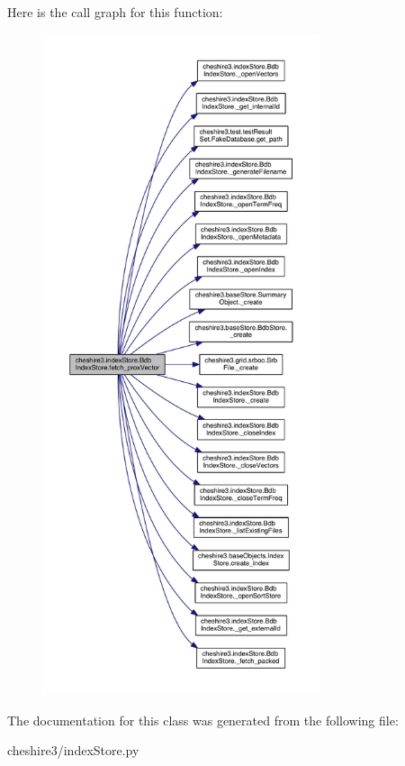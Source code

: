 Here is the call graph for this function\-:
\nopagebreak
\begin{figure}[H]
\begin{center}
\leavevmode
\includegraphics[height=550pt]{classcheshire3_1_1index_store_1_1_bdb_index_store_a4ca65462f1c80173e8d9a9127f4d2d1c_cgraph}
\end{center}
\end{figure}




The documentation for this class was generated from the following file\-:\begin{DoxyCompactItemize}
\item 
cheshire3/index\-Store.\-py\end{DoxyCompactItemize}
